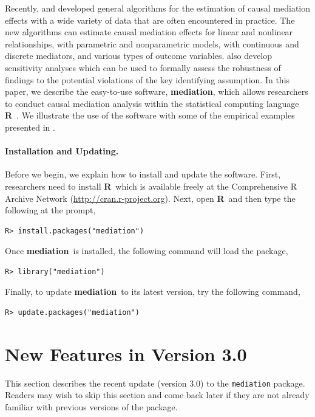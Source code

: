 \documentclass[11pt,letterpaper]{article}
\theoremstyle{plain}
\newcommand\bR{{\bf R}}
\newcommand\bmediation{{\bf mediation}}
\begin{document}
Recently, \citet*{imai:keel:yama:10} and \citet*{imai:keel:ting:10}
developed general algorithms for the estimation of causal mediation
effects with a wide variety of data that are often encountered in
practice.  The new algorithms can estimate causal mediation effects
for linear and nonlinear relationships, with parametric and
nonparametric models, with continuous and discrete mediators, and
various types of outcome variables.
\citet{imai:keel:yama:10,imai:keel:ting:10} also develop sensitivity
analyses which can be used to formally assess the robustness of
findings to the potential violations of the key identifying
assumption.  In this paper, we describe the easy-to-use software,
\bmediation, which allows researchers to conduct causal mediation
analysis within the statistical computing language \bR\ \citep{R:09}.
We illustrate the use of the software with some of the empirical
examples presented in \citet{imai:keel:ting:10}.

\paragraph{Installation and Updating.} Before we begin, we explain how
to install and update the software.  First, researchers need to
install \bR\ which is available freely at the Comprehensive R Archive
Network (\href{http://cran.r-project.org}{http://cran.r-project.org}).
Next, open \bR\ and then type the following at the prompt,
\begin{verbatim}
R> install.packages("mediation")
\end{verbatim}
Once \bmediation\ is installed, the following command will load the package,
\begin{verbatim}
R> library("mediation")
\end{verbatim}
Finally, to update \bmediation\ to its latest version, try the
following command,
\begin{verbatim}
R> update.packages("mediation")
\end{verbatim}

\section{New Features in Version 3.0}

This section describes the recent update (version 3.0) to the {\tt mediation} 
package.  Readers may wish to skip this section and come back later if they are
not already familiar with previous versions of the package.
\end{document}
